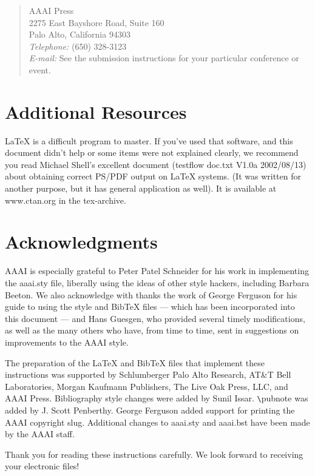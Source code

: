 \documentclass[letterpaper]{article}
\begin{document}
\begin{quote}
\noindent AAAI Press\\
2275 East Bayshore Road, Suite 160\\
Palo Alto, California 94303\\ 
\textit{Telephone:} (650) 328-3123\\ 
\textit{E-mail:} See the submission instructions for your particular conference or event.
\end{quote}

\section{Additional Resources}
\LaTeX{} is a difficult program to master. If you've used that software, and this document didn't help or some items were not explained clearly, we recommend you read Michael Shell's excellent document (testflow doc.txt V1.0a 2002/08/13) about obtaining correct PS/PDF output on \LaTeX{} systems. (It was written for another purpose, but it has general application as well). It is available at www.ctan.org in the tex-archive.

\section{ Acknowledgments}
AAAI is especially grateful to Peter Patel Schneider for his work in implementing the aaai.sty file, liberally using the ideas of other style hackers, including Barbara Beeton. We also acknowledge with thanks the work of George Ferguson for his guide to using the style and BibTeX files --- which has been incorporated into this document  --- and Hans Guesgen, who provided several timely modifications, as well as the many others who have, from time to time, sent in suggestions on improvements to the AAAI style. 

The preparation of the \LaTeX{} and Bib\TeX{} files that implement these instructions was supported by Schlumberger Palo Alto Research, AT\&T Bell Laboratories, Morgan Kaufmann Publishers, The Live Oak Press, LLC, and AAAI Press. Bibliography style changes were added by Sunil Issar. \verb+\+pubnote was added by J. Scott Penberthy. George Ferguson added support for printing the AAAI copyright slug. Additional changes to aaai.sty and aaai.bst have been made by the AAAI staff.

\bigskip
\noindent Thank you for reading these instructions carefully. We look forward to receiving your electronic files!
\end{document}
